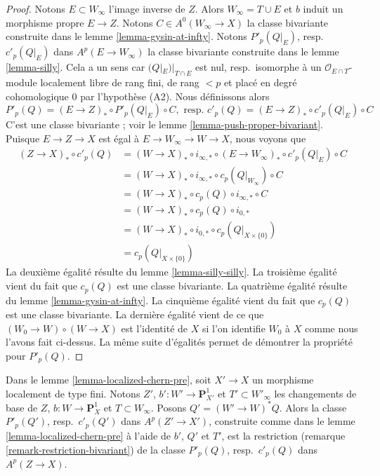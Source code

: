 \begin{proof}
Notons $E \subset W_\infty$ l'image inverse de $Z$. Alors
$W_\infty = T \cup E$ et $b$ induit un morphisme propre $E \to Z$.
Notons $C \in A^0(W_\infty \to X)$ la classe bivariante construite
dans le lemme \ref{lemma-gysin-at-infty}. Notons $P'_p(Q|_E)$, resp.\ $c'_p(Q|_E)$
dans $A^p(E \to W_\infty)$ la classe bivariante construite
dans le lemme \ref{lemma-silly}. Cela a un sens car
$(Q|_E)|_{T \cap E}$ est nul, resp.\ isomorphe à un
$\mathcal{O}_{E \cap T}$-module localement libre de rang fini, de rang $< p$ et placé en
degré cohomologique $0$ par l'hypothèse (A2). Nous définissons alors
$$
P'_p(Q) = (E \to Z)_* \circ P'_p(Q|_E) \circ C,\text{ resp. }
c'_p(Q) = (E \to Z)_* \circ c'_p(Q|_E) \circ C
$$
C'est une classe bivariante ; voir le lemme \ref{lemma-push-proper-bivariant}.
Puisque $E \to Z \to X$ est égal à $E \to W_\infty \to W \to X$, nous voyons que
\begin{align*}
(Z \to X)_* \circ c'_p(Q)
& =
(W \to X)_* \circ i_{\infty, *} \circ (E \to W_\infty)_*
\circ c'_p(Q|_E) \circ C \\
& =
(W \to X)_* \circ i_{\infty, *} \circ c_p(Q|_{W_\infty}) \circ C \\
& =
(W \to X)_* \circ c_p(Q) \circ i_{\infty, *} \circ C \\
& =
(W \to X)_*\circ c_p(Q) \circ i_{0, *} \\
& =
(W \to X)_* \circ i_{0, *} \circ c_p(Q|_{X \times \{0\}}) \\
& =
c_p(Q|_{X \times \{0\}})
\end{align*}
La deuxième égalité résulte du lemme \ref{lemma-silly-silly}.
La troisième égalité vient du fait que $c_p(Q)$ est une classe bivariante.
La quatrième égalité résulte du lemme \ref{lemma-gysin-at-infty}.
La cinquième égalité vient du fait que $c_p(Q)$ est une classe bivariante.
La dernière égalité vient de ce que $(W_0 \to W) \circ (W \to X)$
est l'identité de $X$ si l'on identifie $W_0$ à $X$ comme nous l'avons
fait ci-dessus. La même suite d'égalités permet de
démontrer la propriété pour $P'_p(Q)$.
\end{proof}

\begin{lemma}
\label{lemma-base-change-localized-chern-pre}
Dans le lemme \ref{lemma-localized-chern-pre}, soit $X' \to X$ un morphisme
localement de type fini. Notons
$Z'$, $b' : W' \to \mathbf{P}^1_{X'}$ et $T' \subset W'_\infty$
les changements de base de $Z$, $b : W \to \mathbf{P}^1_X$ et $T \subset W_\infty$.
Posons $Q' = (W' \to W)^*Q$. Alors la classe
$P'_p(Q')$, resp.\ $c'_p(Q')$ dans $A^p(Z' \to X')$, construite comme dans le
lemme \ref{lemma-localized-chern-pre} à l'aide de $b'$, $Q'$ et $T'$,
est la restriction (remarque \ref{remark-restriction-bivariant})
de la classe $P'_p(Q)$, resp.\ $c'_p(Q)$ dans $A^p(Z \to X)$.
\end{lemma}

